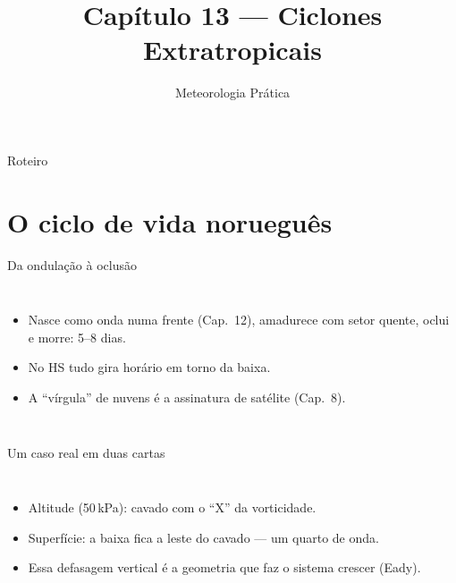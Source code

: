 \documentclass[aspectratio=169,11pt]{beamer}
\title[Cap. 13 --- Ciclones Extratropicais]{Capítulo 13 --- Ciclones
Extratropicais}
\subtitle{Meteorologia Prática}
\author{}
\date{}
\begin{document}
\begin{frame}
  \titlepage
  \vfill
  \atribuicao
\end{frame}

\begin{frame}{Roteiro}
  \tableofcontents
\end{frame}

\section{O ciclo de vida norueguês}

\begin{frame}{Da ondulação à oclusão}
  \begin{columns}
    \begin{itemize}
      \item Nasce como onda numa frente (Cap.~12), amadurece com setor
            quente, oclui e morre: 5--8 dias.
      \item No HS tudo gira \alert{horário} em torno da baixa.
      \item A ``vírgula'' de nuvens é a assinatura de satélite
            (Cap.~8).
    \end{itemize}
  \end{columns}
\end{frame}

\begin{frame}{Um caso real em duas cartas}
  \begin{columns}
    \begin{itemize}
      \item Altitude (50\,kPa): cavado com o ``X'' da vorticidade.
      \item Superfície: a baixa fica \alert{a leste} do cavado — um
            quarto de onda.
      \item Essa defasagem vertical é a geometria que faz o sistema
            crescer (Eady).
    \end{itemize}
  \end{columns}
\end{frame}
\end{document}
